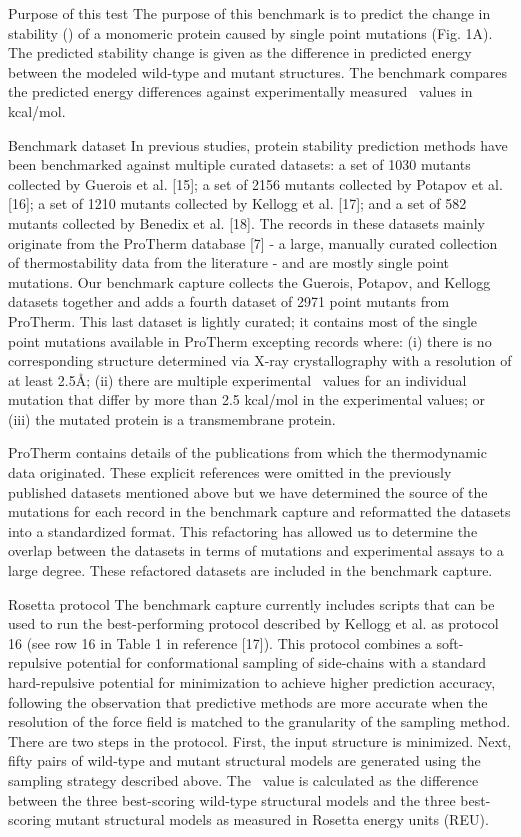Purpose of this test
The purpose of this benchmark is to predict the change in stability (\ddg) of a monomeric protein caused by single point mutations (Fig. 1A). The predicted stability change is given as the difference in predicted energy between the modeled wild-type and mutant structures. The benchmark compares the predicted energy differences against experimentally measured \ddg\ values in kcal/mol.

Benchmark dataset
In previous studies, protein stability prediction methods have been benchmarked against multiple curated datasets: a set of 1030 mutants collected by Guerois et al. [15]; a set of 2156 mutants collected by Potapov et al. [16]; a set of 1210 mutants collected by Kellogg et al. [17]; and a set of 582 mutants collected by Benedix et al. [18]. The records in these datasets mainly originate from the ProTherm database [7] - a large, manually curated collection of thermostability data from the literature - and are mostly single point mutations. Our benchmark capture collects the Guerois, Potapov, and Kellogg datasets together and adds a fourth dataset of 2971 point mutants from ProTherm. This last dataset is lightly curated; it contains most of the single point mutations available in ProTherm excepting records where: (i) there is no corresponding structure determined via X-ray crystallography with a resolution of at least 2.5Å; (ii) there are multiple experimental \ddg\ values for an individual mutation that differ by more than 2.5 kcal/mol in the experimental values; or (iii) the mutated protein is a transmembrane protein.

ProTherm contains details of the publications from which the thermodynamic data originated. These explicit references were omitted in the previously published datasets mentioned above but we have determined the source of the mutations for each record in the benchmark capture and reformatted the datasets into a standardized format. This refactoring has allowed us to determine the overlap between the datasets in terms of mutations and experimental assays to a large degree. These refactored datasets are included in the benchmark capture.

Rosetta protocol
The benchmark capture currently includes scripts that can be used to run the best-performing protocol described by Kellogg et al. as protocol 16 (see row 16 in Table 1 in reference [17]). This protocol combines a soft-repulsive potential for conformational sampling of side-chains with a standard hard-repulsive potential for minimization to achieve higher prediction accuracy, following the observation that predictive methods are more accurate when the resolution of the force field is matched to the granularity of the sampling method. There are two steps in the protocol. First, the input structure is minimized. Next, fifty pairs of wild-type and mutant structural models are generated using the sampling strategy described above. The \ddg\ value is calculated as the difference between the three best-scoring wild-type structural models and the three best-scoring mutant structural models as measured in Rosetta energy units (REU).

